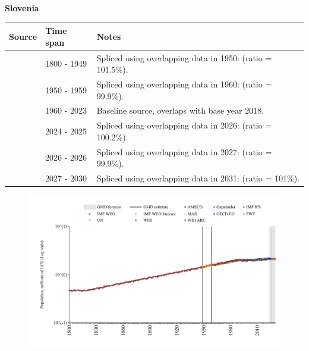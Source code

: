 \documentclass[12pt,a4paper,landscape]{article}
\begin{document}
\begin{adjustbox}{max totalsize={\paperwidth}{\paperheight},center}
\begin{minipage}[t][\textheight][t]{\textwidth}
\vspace*{0.5cm}
{}
\begin{center}
{\Large\bfseries Slovenia}
\end{center}
\vspace{0.5cm}
\begin{table}[H]
\centering
\small
\begin{tabular}{|l|l|l|}
\hline
\textbf{Source} & \textbf{Time span} & \textbf{Notes} \\
\hline
\rowcolor{white}\cite{Gapminder}& 1800 - 1949 &Spliced using overlapping data in 1950: (ratio = 101.5\%).\\
\rowcolor{lightgray}\cite{IMF_IFS}& 1950 - 1959 &Spliced using overlapping data in 1960: (ratio = 99.9\%).\\
\rowcolor{white}\cite{WDI}& 1960 - 2023 &Baseline source, overlaps with base year 2018.\\
\rowcolor{lightgray}\cite{OECD_EO}& 2024 - 2025 &Spliced using overlapping data in 2026: (ratio = 100.2\%).\\
\rowcolor{white}\cite{AMECO}& 2026 - 2026 &Spliced using overlapping data in 2027: (ratio = 99.9\%).\\
\rowcolor{lightgray}\cite{Gapminder}& 2027 - 2030 &Spliced using overlapping data in 2031: (ratio = 101\%).\\
\hline
\end{tabular}
\end{table}
\begin{figure}[H]
\centering
\includegraphics[width=\textwidth,height=0.6\textheight,keepaspectratio]{graphs/SVN_pop.pdf}
\end{figure}
\end{minipage}
\end{adjustbox}
\end{document}
